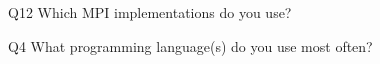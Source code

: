 \begin{description}%
\item{Q12} Which MPI implementations do you use?%
\item{Q4} What programming language(s) do you use most often?%
\end{description}%

